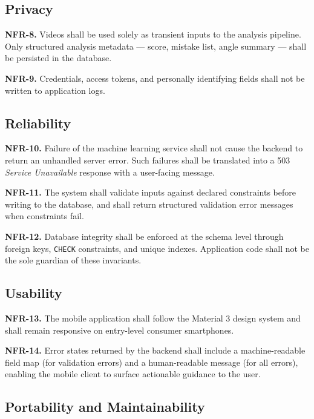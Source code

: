\subsection{Privacy}
\label{subsec:nfr-privacy}

\textbf{NFR-8.} Videos shall be used solely as transient inputs to the analysis pipeline. Only structured analysis metadata — score, mistake list, angle summary — shall be persisted in the database.

\textbf{NFR-9.} Credentials, access tokens, and personally identifying fields shall not be written to application logs.

\subsection{Reliability}
\label{subsec:nfr-reliability}

\textbf{NFR-10.} Failure of the machine learning service shall not cause the backend to return an unhandled server error. Such failures shall be translated into a 503 \emph{Service Unavailable} response with a user-facing message.

\textbf{NFR-11.} The system shall validate inputs against declared constraints before writing to the database, and shall return structured validation error messages when constraints fail.

\textbf{NFR-12.} Database integrity shall be enforced at the schema level through foreign keys, \texttt{CHECK} constraints, and unique indexes. Application code shall not be the sole guardian of these invariants.

\subsection{Usability}
\label{subsec:nfr-usability}

\textbf{NFR-13.} The mobile application shall follow the Material 3 design system and shall remain responsive on entry-level consumer smartphones.

\textbf{NFR-14.} Error states returned by the backend shall include a machine-readable field map (for validation errors) and a human-readable message (for all errors), enabling the mobile client to surface actionable guidance to the user.

\subsection{Portability and Maintainability}
\label{subsec:nfr-portability}

